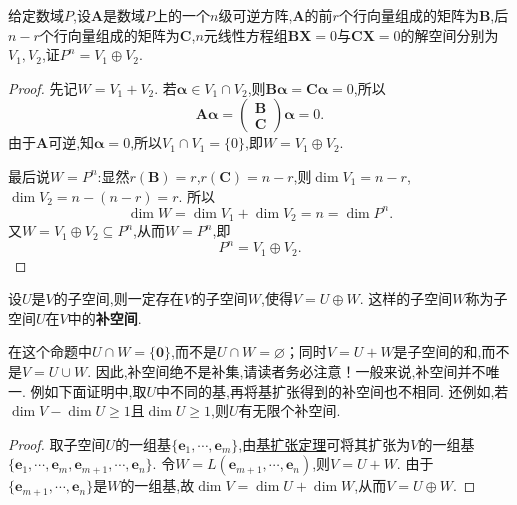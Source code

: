 \documentclass[../../main.tex]{subfiles}%
\begin{document}
\begin{example}\label{example:561.16}
给定数域\(P\),设\(\boldsymbol{A}\)是数域\(P\)上的一个\(n\)级可逆方阵,\(\boldsymbol{A}\)的前\(r\)个行向量组成的矩阵为\(\boldsymbol{B}\),后\(n - r\)个行向量组成的矩阵为\(\boldsymbol{C}\),\(n\)元线性方程组\(\boldsymbol{B}\boldsymbol{X}=0\)与\(\boldsymbol{C}\boldsymbol{X}=0\)的解空间分别为\(V_1,V_2\),证\(P^n = V_1\oplus V_2\).
\end{example}
\begin{proof}

先记\(W = V_1 + V_2\). 若\(\boldsymbol{\alpha}\in V_1\cap V_2\),则\(\boldsymbol{B}\boldsymbol{\alpha}=\boldsymbol{C}\boldsymbol{\alpha}=0\),所以
\[
\boldsymbol{A}\boldsymbol{\alpha}=\begin{pmatrix}
\boldsymbol{B}\\
\boldsymbol{C}
\end{pmatrix}\boldsymbol{\alpha}=0.
\]
由于\(\boldsymbol{A}\)可逆,知\(\boldsymbol{\alpha}=0\),所以\(V_1\cap V_1 = \{0\}\),即\(W = V_1\oplus V_2\).

最后说\(W = P^n\):显然\(r(\boldsymbol{B}) = r\),\(r(\boldsymbol{C}) = n - r\),则\(\dim V_1 = n - r\),\(\dim V_2 = n-(n - r)=r\). 所以
\[
\dim W=\dim V_1+\dim V_2=n=\dim P^n.
\]
又\(W = V_1\oplus V_2\subseteq P^n\),从而\(W = P^n\),即
\[
P^n = V_1\oplus V_2.
\]  

\end{proof}


\begin{proposition}[任意子空间一定存在相应的补空间]\label{proposition:补空间}
设\(U\)是\(V\)的子空间,则一定存在\(V\)的子空间\(W\),使得\(V = U\oplus W\). 这样的子空间\(W\)称为子空间\(U\)在\(V\)中的\textbf{补空间}.
\end{proposition}
\begin{remark}
在这个命题中\(U\cap W = \{ \boldsymbol{0}\}\),而不是\(U\cap W=\varnothing\)；同时\(V = U + W\)是子空间的和,而不是\(V = U\cup W\). 因此,补空间绝不是补集,请读者务必注意！一般来说,补空间并不唯一. 例如下面证明中,取$U$中不同的基,再将基扩张得到的补空间也不相同.
还例如,若\(\dim V-\dim U\geqslant 1\)且\(\dim U\geqslant 1\),则\(U\)有无限个补空间.
\end{remark}
\begin{proof}

取子空间\(U\)的一组基\(\{\boldsymbol{e}_1,\cdots,\boldsymbol{e}_m\}\),由\hyperref[theorem:基扩充定理]{基扩张定理}可将其扩张为\(V\)的一组基\(\{\boldsymbol{e}_1,\cdots,\boldsymbol{e}_m,\boldsymbol{e}_{m + 1},\cdots,\boldsymbol{e}_n\}\). 令\(W = L(\boldsymbol{e}_{m + 1},\cdots,\boldsymbol{e}_n)\),则\(V = U+W\). 由于\(\{\boldsymbol{e}_{m + 1},\cdots,\boldsymbol{e}_n\}\)是\(W\)的一组基,故\(\dim V=\dim U+\dim W\),从而\(V = U\oplus W\). 


\end{proof}
\end{document}
